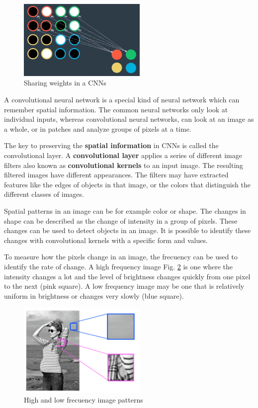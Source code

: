 \documentclass{article}
\begin{document}
\begin{figure}[ht]
    \centering
    \includegraphics[width=0.55\textwidth,height=0.55\textheight,keepaspectratio]{images/shared_weights.png}
    \captionsetup{justification=centering}
    \caption{Sharing weights in a CNNs}
    \label{fig:f10}
\end{figure}

A convolutional neural network is a special kind of neural network which can remember spatial information. The common neural networks only look at individual inputs, whereas convolutional neural networks, can look at an image as a whole, or in patches and analyze groups of pixels at a time.

The key to preserving the \textbf{spatial information} in CNNs is called the convolutional layer. A \textbf{convolutional layer} applies a series of different image filters also known as \textbf{convolutional kernels} to an input image. The resulting filtered images have different appearances. The filters may have extracted features like the edges of objects in that image, or the colors that distinguish the different classes of images.

Spatial patterns in an image can be for example color or shape. The changes in shape can be described as the change of intensity in a group of pixels. These changes can be used to detect objects in an image. It is possible to identify these changes with convolutional kernels with a specific form and values.

To measure how the pixels change in an image, the frecuency can be used to identify the rate of change. A high frequency image Fig. \ref{fig:f11} is one where the intensity changes a lot  and the level of brightness changes quickly from one pixel to the next (pink square). A low frequency image may be one that is relatively uniform in brightness or changes very slowly (blue square). 

\begin{figure}[ht]
    \centering
    \includegraphics[width=0.55\textwidth,height=0.55\textheight,keepaspectratio]{images/frec.png}
    \captionsetup{justification=centering}
    \caption{High and low frecuency image patterns}
    \label{fig:f11}
\end{figure}
\end{document}
